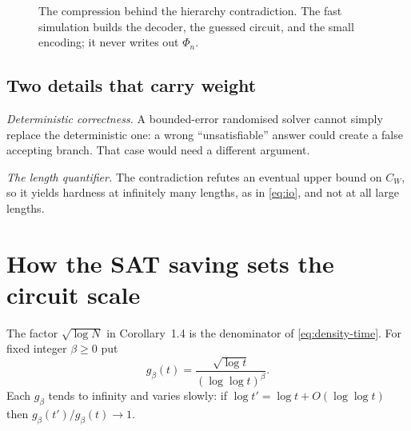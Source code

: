 \documentclass[11pt,reqno]{amsart}
\numberwithin{equation}{section}
\theoremstyle{plain}
\theoremstyle{definition}
\theoremstyle{remark}
\begin{document}
\begin{figure}[htbp]
\centering
{}
\caption{The compression behind the hierarchy contradiction. The fast
simulation builds the decoder, the guessed circuit, and the small encoding;
it never writes out $\Phi_n$.}
\label{fig:circuit-proof}
\end{figure}

\subsection{Two details that carry weight}
\emph{Deterministic correctness.} A bounded-error randomised solver cannot
simply replace the deterministic one: a wrong ``unsatisfiable'' answer could
create a false accepting branch. That case would need a different argument.

\emph{The length quantifier.} The contradiction refutes an eventual upper
bound on $C_W$, so it yields hardness at infinitely many lengths, as in
\eqref{eq:io}, and not at all large lengths.

\section{How the SAT saving sets the circuit scale}\label{sec:scale}
The factor $\sqrt{\log N}$ in Corollary~1.4 is the denominator of
\eqref{eq:density-time}. For fixed integer $\beta\ge0$ put
\begin{equation}\label{eq:g-beta}
 g_\beta(t)=\frac{\sqrt{\log t}}{(\log\log t)^\beta}.
\end{equation}
Each $g_\beta$ tends to infinity and varies slowly: if
$\log t'=\log t+O(\log\log t)$ then $g_\beta(t')/g_\beta(t)\to1$.
\end{document}
